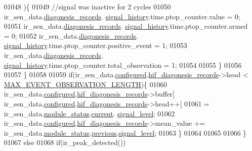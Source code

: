 \begin{DoxyCode}
{{01048                     )\{
01049                        \textcolor{comment}{//signal was inactive for 2 cycles}
01050                        ir\_sen\_data.\hyperlink{a00023_a7ae905b560513ad201e58c2f63375030}{diagonesis\_records}.
      \hyperlink{a00017_affb63906d23cb1cb7787d61eaaedfb60}{signal\_history}.time.ptop\_counter.value = 0;
01051                        ir\_sen\_data.\hyperlink{a00023_a7ae905b560513ad201e58c2f63375030}{diagonesis\_records}.
      \hyperlink{a00017_affb63906d23cb1cb7787d61eaaedfb60}{signal\_history}.time.ptop\_counter.armed = 0;
01052                        ir\_sen\_data.\hyperlink{a00023_a7ae905b560513ad201e58c2f63375030}{diagonesis\_records}.
      \hyperlink{a00017_affb63906d23cb1cb7787d61eaaedfb60}{signal\_history}.time.ptop\_counter.positive\_event = 1;
01053                        ir\_sen\_data.\hyperlink{a00023_a7ae905b560513ad201e58c2f63375030}{diagonesis\_records}.
      \hyperlink{a00017_affb63906d23cb1cb7787d61eaaedfb60}{signal\_history}.time.ptop\_counter.total\_observation = 1;
01054 
01055                      \}
01056 
01057                  \}
01058 
01059                \textcolor{keywordflow}{if}(ir\_sen\_data.\hyperlink{a00023_a94b2d1f6ea4ab334c74d24984dd27843}{configured}.\hyperlink{a00021_ae18294f7499d9fcb5ec796a1816b8cd8}{hif\_diagonesis\_records}->head < 
      \hyperlink{a00022_aa060aeb1ecb530b3c6f6d91060999b70}{MAX\_EVENT\_OBSERVATION\_LENGTH})\{
01060                ir\_sen\_data.\hyperlink{a00023_a94b2d1f6ea4ab334c74d24984dd27843}{configured}.\hyperlink{a00021_ae18294f7499d9fcb5ec796a1816b8cd8}{hif\_diagonesis\_records}->buffer[
      ir\_sen\_data.\hyperlink{a00023_a94b2d1f6ea4ab334c74d24984dd27843}{configured}.\hyperlink{a00021_ae18294f7499d9fcb5ec796a1816b8cd8}{hif\_diagonesis\_records}->head++]
01061                = ir\_sen\_data.\hyperlink{a00023_a5a53c391562b059eb744ac679f3765ca}{module\_status}.\hyperlink{a00017_ab8af48cdbba92b3ae39c4470e53af944}{current}.
      \hyperlink{a00017_abcdf2bc0c2e5a14863938ae28c3bc96e}{signal\_level};
01062                ir\_sen\_data.\hyperlink{a00023_a94b2d1f6ea4ab334c74d24984dd27843}{configured}.\hyperlink{a00021_ae18294f7499d9fcb5ec796a1816b8cd8}{hif\_diagonesis\_records}->mean\_value +=
      ir\_sen\_data.\hyperlink{a00023_a5a53c391562b059eb744ac679f3765ca}{module\_status}.\hyperlink{a00017_a0fc6d9ce6203a17f672c19d3d8747aee}{previous}.\hyperlink{a00017_abcdf2bc0c2e5a14863938ae28c3bc96e}{signal\_level};
01063                \}
01064 
01065 
01066          \}
01067          \textcolor{keywordflow}{else}
01068          \textcolor{keywordflow}{if}(ir\_peak\_detected())
}}
\end{DoxyCode}

